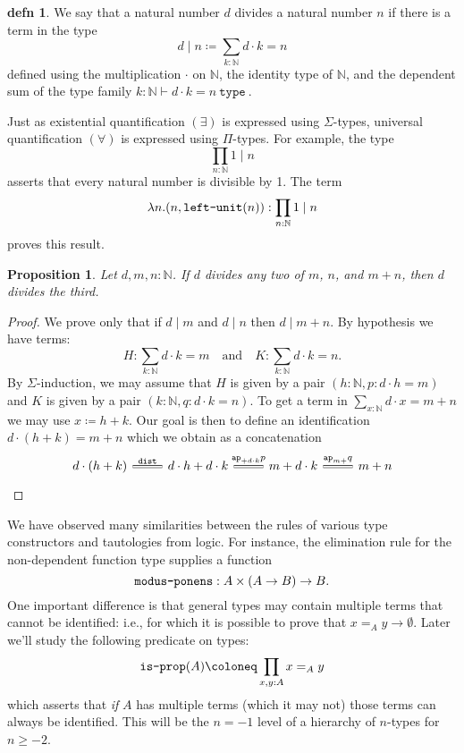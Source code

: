 \documentclass{amsart}
\theoremstyle{theorem}
\newtheorem*{prop}{Proposition}
\theoremstyle{definition}
\newtheorem*{defn}{defn}
\theoremstyle{remark}
\newcommand{\0}{\mathbbe{0}}
\newcommand{\1}{\mathbbe{1}}
\newcommand{\2}{\mathbbe{2}}
\newcommand{\3}{\mathbbe{3}}
\newcommand{\4}{\mathbbe{4}}
\newcommand{\univ}{{~\texttt{type}~}}
\newcommand{\term}[1]{{\textup{\texttt{#1}}}}
\newcommand{\bN}{{\mathbb{N}}}
\newcommand{\ap}{\term{ap}}
\begin{document}
\begin{defn} We say that a natural number $d$ divides a natural number $n$ if there is a term in the type
\[ d \mid n \coloneq \sum_{k : \bN} d \cdot k = n \]
defined using the multiplication $\cdot$ on $\bN$, the identity type of $\bN$, and the dependent sum of the type family $k : \bN \vdash d \cdot k = n \univ$.
\end{defn}

Just as existential quantification $(\exists)$ is expressed using $\Sigma$-types, universal quantification $(\forall)$ is expressed using $\Pi$-types. For example, the type
\[ \prod_{n : \bN} 1 \mid n\]
asserts that every natural number is divisible by 1. The term
\[ \lambda n. (n, \term{left-unit}(n)) : \prod_{n : \bN} 1 \mid n\]
proves this result.

\begin{prop} Let $d, m,n : \bN$. If $d$ divides any two of $m$, $n$, and $m+n$, then $d$ divides the third.
\end{prop}
\begin{proof}
We prove only that if $d \mid m$ and $d \mid n$ then $d \mid m+n$.
By hypothesis we have terms:
\[ H : \sum_{k : \bN} d \cdot k = m \quad \text{and} \quad K : \sum_{k : \bN} d \cdot k = n.\]
By $\Sigma$-induction, we may assume that $H$ is given by a pair $(h : \bN, p : d \cdot h = m)$ and $K$ is given by a pair $(k : \bN, q : d \cdot k = n)$. To get a term in $\sum_{x : \bN} d \cdot x = m + n$ we may use $x \coloneq h + k$. Our goal is then to define an identification $d \cdot (h + k) = m + n$ which we obtain as a concatenation
\[
\begin{tikzcd} d \cdot (h+ k ) \arrow[r, equals, "\term{dist}"] & d \cdot h + d \cdot k \arrow[r, equals, "\ap_{+d \cdot k}p"] & m + d \cdot k \arrow[r, equals, "\ap_{m+}q"] & m + n
\end{tikzcd}
\]
\end{proof}

We have observed many similarities between the rules of various type constructors and tautologies from logic. For instance, the elimination rule for the non-dependent function type supplies a function
\[ \term{modus-ponens} : A \times (A \to B) \to B.\]
One important difference is that general types may contain multiple terms that cannot be identified: i.e., for which it is possible to prove that $x =_A y \to \emptyset$. Later we'll study the following predicate on types:
\[ \term{is-prop}(A) \coloneq \prod_{x,y : A} x =_A y\]
which asserts that \emph{if} $A$ has multiple terms (which it may not) those terms can always be identified. This will be the $n=-1$ level of a hierarchy of $n$-types for $n \geq -2$.
\end{document}
